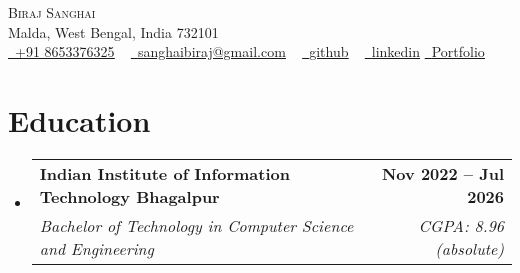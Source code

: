 \documentclass[letterpaper,11pt]{article}
\makeatletter
\newcommand{\resumeItem}[1]{
  \item\small{
    {#1 \vspace{-2pt}}
  }
}
\newcommand{\resumeSubheading}[4]{
  \vspace{-5pt}\item
    \begin{tabular*}{1.0\textwidth}[t]{l@{\extracolsep{\fill}}r}
      \textbf{#1} & \textbf{\small #2} \\
      \textit{\small#3} & \textit{\small #4} \\
    \end{tabular*}\vspace{-5pt}
}
\newcommand{\collegeItem}[1]{
    \item
    \begin{tabular*}{0.97\textwidth}{l@{\extracolsep{\fill}}r}
      \textit{\small#1} & \textit{\small } \\
    \end{tabular*}\vspace{-4pt}
}
\newcommand{\resumeSubHeadingListStart}{\begin{itemize}[leftmargin=0.0in, label={}]}
\newcommand{\resumeSubHeadingListEnd}{\end{itemize}}
\makeatother
\begin{document}

\begin{center}
    {\Huge \scshape Biraj Sanghai} \\ \vspace{1pt}
    Malda, West Bengal, India 732101 \\ \vspace{1pt}
    \href{tel:918653376325}{\color{Blue} \raisebox{-0.2\height}\faPhone\
    \underline {+91 8653376325}} ~ \href{mailto:sanghaibiraj@gmail.com}{\color{Blue} \raisebox{-0.2\height}\faEnvelope\  \underline{sanghaibiraj@gmail.com}} ~ 
    \href{https://github.com/sanghaibiraj}{\color{Blue} \raisebox{-0.2\height}\faGithub\ \underline{github}} ~ 
    \href{https://www.linkedin.com/in/biraj-sanghai-iiitbh}{\color{Blue} \raisebox{-0.2\height}\faLinkedin\ \underline{linkedin}}
    \hspace{2pt}
    \href{https://biraj-sanghai.vercel.app/}{\color{Blue} 
    \raisebox{-0.2\height}\faGlobe\ \underline{Portfolio}}
    \vspace{-8pt}
\end{center}


\section{Education}
  \resumeSubHeadingListStart
  \vspace{4pt}
    \resumeSubheading
      {Indian Institute of Information Technology Bhagalpur}{Nov 2022 -- Jul 2026}
      {Bachelor of Technology in Computer Science and Engineering}{CGPA: 8.96 (absolute)}
  \resumeSubHeadingListEnd
  \vspace{-12pt}
  
\end{document}
